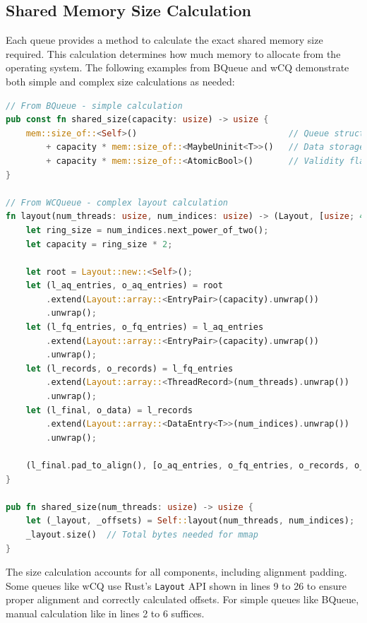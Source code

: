 \subsection{Shared Memory Size Calculation}

Each queue provides a method to calculate the exact shared memory size required. This calculation determines how much memory to allocate from the operating system. The following examples from BQueue and \ac{wCQ} demonstrate both simple and complex size calculations as needed:

\begin{lstlisting}[language=Rust, style=boxed, caption={Shared memory size calculation methods}, label={lst:size-calculation}]
// From BQueue - simple calculation
pub const fn shared_size(capacity: usize) -> usize {
    mem::size_of::<Self>()                              // Queue structure
        + capacity * mem::size_of::<MaybeUninit<T>>()   // Data storage
        + capacity * mem::size_of::<AtomicBool>()       // Validity flags
}

// From WCQueue - complex layout calculation
fn layout(num_threads: usize, num_indices: usize) -> (Layout, [usize; 4]) {
    let ring_size = num_indices.next_power_of_two();
    let capacity = ring_size * 2;
    
    let root = Layout::new::<Self>();
    let (l_aq_entries, o_aq_entries) = root
        .extend(Layout::array::<EntryPair>(capacity).unwrap())
        .unwrap();
    let (l_fq_entries, o_fq_entries) = l_aq_entries
        .extend(Layout::array::<EntryPair>(capacity).unwrap())
        .unwrap();
    let (l_records, o_records) = l_fq_entries
        .extend(Layout::array::<ThreadRecord>(num_threads).unwrap())
        .unwrap();
    let (l_final, o_data) = l_records
        .extend(Layout::array::<DataEntry<T>>(num_indices).unwrap())
        .unwrap();
    
    (l_final.pad_to_align(), [o_aq_entries, o_fq_entries, o_records, o_data])
}

pub fn shared_size(num_threads: usize) -> usize {
    let (_layout, _offsets) = Self::layout(num_threads, num_indices);
    _layout.size()  // Total bytes needed for mmap
}
\end{lstlisting}

The size calculation accounts for all components, including alignment padding. Some queues like \ac{wCQ} use Rust's \texttt{Layout} API shown in lines 9 to 26 to ensure proper alignment and correctly calculated offsets. For simple queues like BQueue, manual calculation like in lines 2 to 6 suffices.

